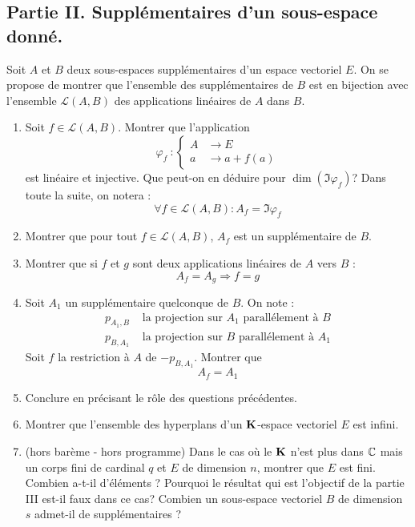 \subsection*{Partie II. Supplémentaires d'un sous-espace donné.}
Soit $A$ et $B$ deux sous-espaces supplémentaires d'un espace vectoriel $E$. On se propose de montrer que l'ensemble des supplémentaires de $B$ est en bijection avec l'ensemble $\mathcal L (A,B)$ des applications linéaires de $A$ dans $B$.
\begin{enumerate}
 \item Soit $f\in \mathcal L (A,B)$. Montrer que l'application 
\begin{displaymath}
 \varphi_f \: : \left\lbrace 
\begin{aligned}
 A &\rightarrow E \\
 a &\rightarrow a + f(a)
\end{aligned}
\right. 
\end{displaymath}
est linéaire et injective. Que peut-on en déduire pour $\dim (\Im \varphi_f)$? Dans toute la suite, on notera :
\begin{displaymath}
 \forall f\in \mathcal L (A,B) : A_f = \Im \varphi_f
\end{displaymath}
\item Montrer que pour tout $f\in \mathcal L (A,B)$, $A_f$ est un supplémentaire de $B$.
\item Montrer que si $f$ et $g$ sont deux applications linéaires de $A$ vers $B$ :
\begin{displaymath}
 A_f = A_g \Rightarrow f=g
\end{displaymath}
\item Soit $A_1$ un supplémentaire quelconque de $B$. On note :
\begin{align*}
 p_{A_1,B} &\text{ la projection sur } A_1 \text{ parallélement à } B \\
 p_{B,A_1} &\text{ la projection sur } B \text{ parallélement à } A_1 
\end{align*}
Soit $f$ la restriction à $A$ de $-p_{B,A_1}$. Montrer que
\begin{displaymath}
 A_f = A_1
\end{displaymath}
\item Conclure en précisant le rôle des questions précédentes.
\item Montrer que l'ensemble des hyperplans d'un $\mathbf{K}$-espace vectoriel $E$ est infini.
\item (hors barème - hors programme) Dans le cas où le $\mathbf{K}$ n'est plus dans $\mathbb{C}$ mais un corps fini de cardinal $q$ et $E$ de dimension $n$, montrer que $E$ est fini. Combien a-t-il d'éléments ? Pourquoi le résultat qui est l'objectif de la partie III est-il faux dans ce cas? Combien un sous-espace vectoriel $B$ de dimension $s$ admet-il de supplémentaires ?
\end{enumerate}

